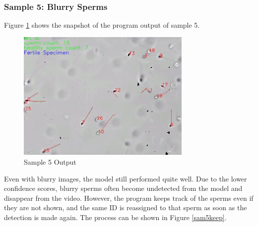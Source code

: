 \subsubsection{Sample 5: Blurry Sperms}
Figure \ref{sam5res} shows the snapshot of the program output of sample 5.
\begin{figure}[h]
    \centering
    \includegraphics[width=0.75\textwidth]{Images/sam5.png}
    \caption{Sample 5 Output}
    \label{sam5res}
\end{figure}

Even with blurry images, the model still performed quite well. Due to the lower confidence scores, blurry sperms often become undetected from the model and disappear from the video. However, the program keeps track of the sperms even if they are not shown, and the same ID is reassigned to that sperm as soon as the detection is made again. The process can be shown in Figure \ref{sam5keep}.

